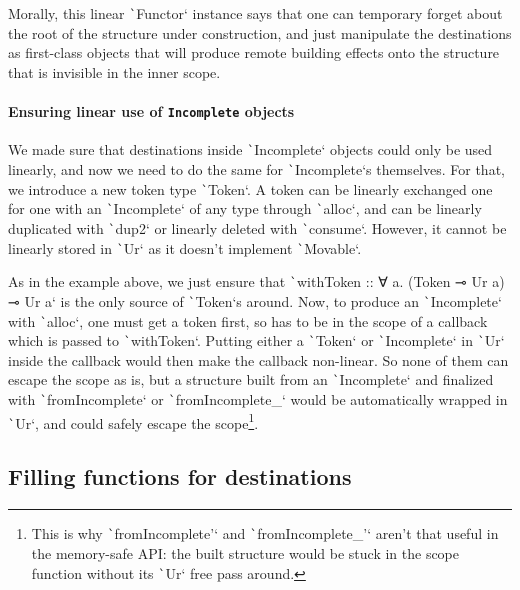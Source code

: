 \documentclass[english]{jflart}
\begin{document}
Morally, this linear \texttt`Functor` instance says that one can temporary forget about the root of the structure under construction, and just manipulate the destinations as first-class objects that will produce remote building effects onto the structure that is invisible in the inner scope.

\paragraph{Ensuring linear use of \texttt{Incomplete} objects}

We made sure that destinations inside \texttt`Incomplete` objects could only be used linearly, and now we need to do the same for \texttt`Incomplete`s themselves. For that, we introduce a new token type \texttt`Token`. A token can be linearly exchanged one for one with an \texttt`Incomplete` of any type through \texttt`alloc`, and can be linearly duplicated with \texttt`dup2` or linearly deleted with \texttt`consume`. However, it cannot be linearly stored in \texttt`Ur` as it doesn't implement \texttt`Movable`.

As in the example above, we just ensure that \texttt`withToken :: ∀ a. (Token ⊸ Ur a) ⊸ Ur a` is the only source of \texttt`Token`s around. Now, to produce an \texttt`Incomplete` with \texttt`alloc`, one must get a token first, so has to be in the scope of a callback which is passed to \texttt`withToken`. Putting either a \texttt`Token` or \texttt`Incomplete` in \texttt`Ur` inside the callback would then make the callback non-linear. So none of them can escape the scope as is, but a structure built from an \texttt`Incomplete` and finalized with \texttt`fromIncomplete` or \texttt`fromIncomplete_` would be automatically wrapped in \texttt`Ur`, and could safely escape the scope\footnote{This is why \texttt`fromIncomplete'` and \texttt`fromIncomplete_'` aren't that useful in the memory-safe API: the built structure would be stuck in the scope function without its \texttt`Ur` free pass around.}.

\subsection{Filling functions for destinations}
\end{document}
